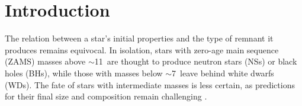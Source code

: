 \documentclass[main.tex]{subfiles}
\begin{document}
    
    {
        \minitoc
        \newpage
    }
    
    
\section{Introduction} \label{sec:intro}

The relation between a star's initial properties and the type of remnant it produces remains equivocal.  In isolation, stars with zero-age main sequence 
(ZAMS)  masses above $\sim $11\msun\ are  thought to produce 
neutron stars (NSs) or black holes (BHs), while those with 
masses below $\sim$7\msun\ leave behind white dwarfs (WDs). The 
fate of stars with intermediate masses is less certain, as 
predictions for their final size and composition remain  
challenging \citep[][and references therein]{dec07:siess, Poelarends:2007ip, doherty2015, Farmer:2015afs}. 
\end{document}
